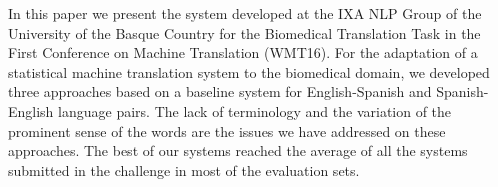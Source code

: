 In this paper we present the system developed at the IXA NLP Group of the University of the Basque Country for the Biomedical Translation Task in the First Conference on Machine Translation (WMT16). For the adaptation of a statistical machine translation system to the biomedical domain, we developed three approaches based on a baseline system for English-Spanish and Spanish-English language pairs. The lack of terminology and the variation of the prominent sense of the words are the issues we have addressed on these approaches. The best of our systems reached the average of all the systems submitted in the challenge in most of the evaluation sets.

